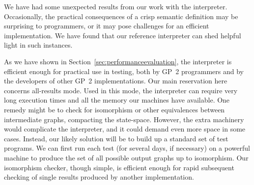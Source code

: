 We have had some unexpected results from our work with the interpreter.
Occasionally, the practical consequences of a crisp semantic definition
may be surprising to programmers, or it may pose challenges for an efficient
implementation.
We have found that our reference interpreter can shed helpful light in
such instances.

As we have shown in Section~\ref{sec:performanceevaluation}, the interpreter is efficient enough for practical use in testing,
both by GP~2 programmers and by the developers of other GP~2 implementations.
Our main reservation here concerns all-results mode.
Used in this mode, the interpreter can require very long execution times and all the memory our machines have available.
One remedy might be to check for isomorphism or other equivalences
between intermediate graphs, compacting the state-space.
However, the extra machinery would complicate the interpreter, and it
could demand even more space in some cases.
Instead, our likely solution will be to build up a standard set of test programs.
We can first run each test (for several days, if necessary)
on a powerful machine to produce the set of all possible output graphs up to isomorphism.
Our isomorphism checker, though simple, is efficient enough for rapid
subsequent checking of single results produced by another implementation.


